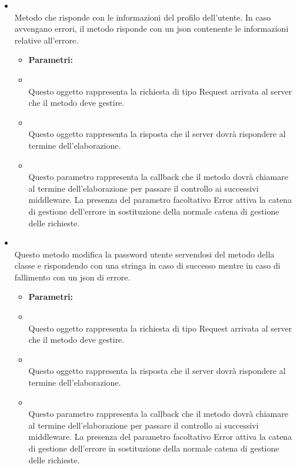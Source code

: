 \begin{itemize}
\begin{itemize}
\end{itemize}
\item[] \textbf{} \\ Metodo che risponde con le informazioni del profilo dell'utente. In caso avvengano errori, il metodo risponde con un json contenente le informazioni relative all'errore.
\begin{itemize}\addtolength{\itemsep}{-0.5\baselineskip}
\item[] \textbf{Parametri:}
\item[]  \\ Questo oggetto rappresenta la richiesta di tipo Request arrivata al server che il metodo deve gestire.
\item[]  \\ Questo oggetto rappresenta la risposta che il server dovrà rispondere al termine dell'elaborazione.
\item[]  \\ Questo parametro rappresenta la callback che il metodo dovrà chiamare al termine dell'elaborazione per passare il controllo ai successivi middleware. La presenza del parametro facoltativo Error attiva la catena di gestione dell'errore in sostituzione della normale catena di gestione delle richieste.
\end{itemize}
\item[] \textbf{} \\ Questo metodo modifica la password utente servendosi del metodo  della classe  e rispondendo con una stringa in caso di successo mentre in caso di fallimento con un json di errore.
\begin{itemize}\addtolength{\itemsep}{-0.5\baselineskip}
\item[] \textbf{Parametri:}
\item[]  \\ Questo oggetto rappresenta la richiesta di tipo Request arrivata al server che il metodo deve gestire.
\item[]  \\ Questo oggetto rappresenta la risposta che il server dovrà rispondere al termine dell'elaborazione.
\item[]  \\ Questo parametro rappresenta la callback che il metodo dovrà chiamare al termine dell'elaborazione per passare il controllo ai successivi middleware. La presenza del parametro facoltativo Error attiva la catena di gestione dell'errore in sostituzione della normale catena di gestione delle richieste.
\end{itemize}
\end{itemize}

